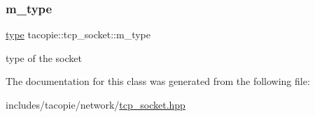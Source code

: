 \subsubsection{\texorpdfstring{m\+\_\+type}{m\_type}}
{\footnotesize\ttfamily \hyperlink{classtacopie_1_1tcp__socket_ad8376e85df96ab9523f5d079ed7172ab}{type} tacopie\+::tcp\+\_\+socket\+::m\+\_\+type\hspace{0.3cm}{\ttfamily [private]}}

type of the socket 

The documentation for this class was generated from the following file\+:\begin{DoxyCompactItemize}
\item 
includes/tacopie/network/\hyperlink{tcp__socket_8hpp}{tcp\+\_\+socket.\+hpp}\end{DoxyCompactItemize}
